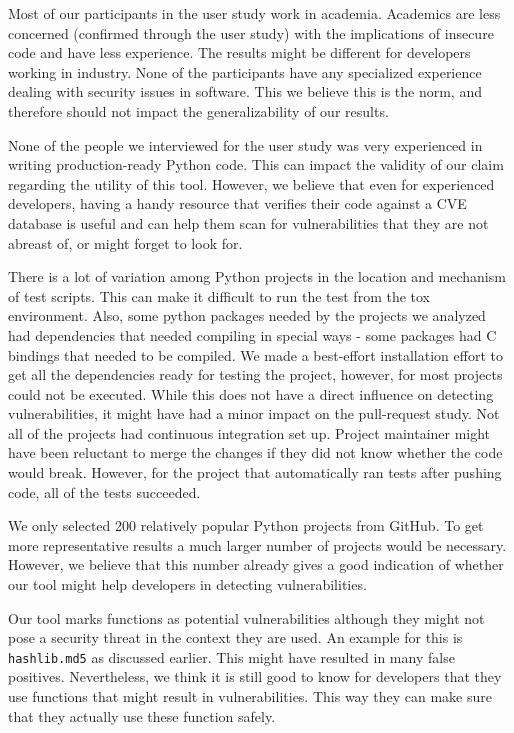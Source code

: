 Most of our participants in the user study work in academia. Academics are less concerned (confirmed through the user study) with the implications of insecure code and have less experience. The results might be different for developers working in industry. None of the participants have any specialized experience dealing with security issues in software. This we believe this is the norm, and therefore should not impact the generalizability of our results. 

None of the people we interviewed for the user study was very experienced in writing production-ready Python code. This can impact the validity of our claim regarding the utility of this tool. However, we believe that even for experienced developers, having a handy resource that verifies their code against a CVE database is useful and can help them scan for vulnerabilities that they are not abreast of, or might forget to look for. 

There is a lot of variation among Python projects in the location and mechanism of test scripts. This can make it difficult to run the test from the tox environment. Also, some python packages needed by the projects we analyzed had dependencies that needed compiling in special ways - some packages had C bindings that needed to be compiled. We made a best-effort installation effort to get all the dependencies ready for testing the project, however, for most projects could not be executed. While this does not have a direct influence on detecting vulnerabilities, it might have had a minor impact on the pull-request study. Not all of the projects had continuous integration set up. Project maintainer might have been reluctant to merge the changes if they did not know whether the code would break. However, for the project that automatically ran tests after pushing code, all of the tests succeeded. 

We only selected 200 relatively popular Python projects from GitHub. To get more representative results a much larger number of projects would be necessary. However, we believe that this number already gives a good indication of whether our tool might help developers in detecting vulnerabilities.

Our tool marks functions as potential vulnerabilities although they might not pose a security threat in the context they are used. An example for this is \texttt{hashlib.md5} as discussed earlier. This might have resulted in many false positives. Nevertheless, we think it is still good to know for developers that they use functions that might result in vulnerabilities. This way they can make sure that they actually use these function safely.